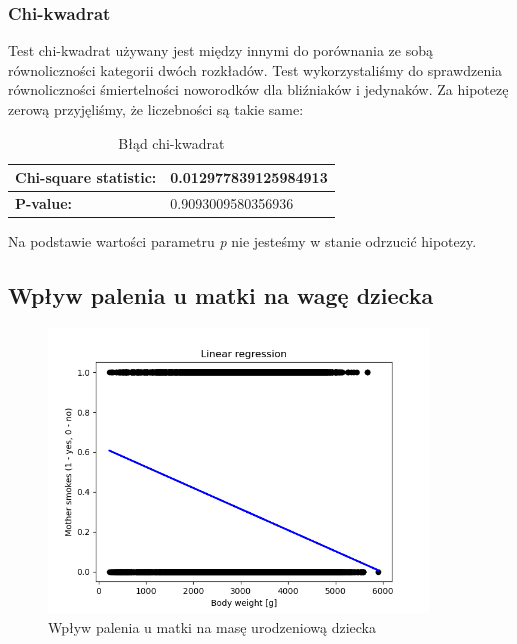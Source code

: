 \documentclass{classrep}
\begin{document}
    \subsubsection{Chi-kwadrat}
    
    Test chi-kwadrat używany jest między innymi do porównania ze sobą równoliczności kategorii dwóch rozkładów. Test wykorzystaliśmy do sprawdzenia równoliczności śmiertelności noworodków dla bliźniaków i jedynaków. Za hipotezę zerową przyjęliśmy, że liczebności są takie same:
    
    \begin{table}[H]
    \centering
    \caption{Błąd chi-kwadrat}
    \label{tab:error}
    \begin{tabular}{|l|l|}
    \hline
    \textbf{Chi-square statistic:} & 0.012977839125984913 \\ \hline
    \textbf{P-value:} & 0.9093009580356936 \\ \hline
    \end{tabular}
    \end{table}
    
    Na podstawie wartości parametru \textit{p} nie jesteśmy w stanie odrzucić hipotezy.
    \subsection{Wpływ palenia u matki na wagę dziecka}
        \begin{figure}[H]
            \centering
            \includegraphics[width=0.9\textwidth]{images/images2/LinearRegression.png}
            \caption{Wpływ palenia u matki na masę urodzeniową dziecka}
            \label{fig1}
        \end{figure}
        
\end{document}
